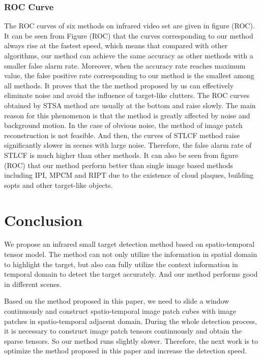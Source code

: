 \documentclass[journal]{IEEEtran}
\begin{document}
\subsubsection{ROC Curve}
The ROC curves of six methods on infrared video set are given in figure (ROC). It can be seen from Figure (ROC) that the curves corresponding to our method always rise at the fastest speed, which means that compared with other algorithms, our method can achieve the same accuracy as other methods with a smaller false alarm rate. Moreover, when the accuracy rate reaches maximum value, the false positive rate corresponding to our method is the smallest among all methods. It proves that the the method proposed by us can effectively eliminate noise and avoid the influence of target-like clutters. The ROC curves obtained by STSA method are usually at the bottom and raise slowly. The main reason for this phenomenon is that the method is greatly affected by noise and background motion. In the case of obvious noise, the method of image patch reconstruction is not feasible. And then, the curves of STLCF method raise significantly slower in scenes with large noise. Therefore, the false alarm rate of STLCF is much higher than other methods. It can also be seen from figure (ROC) that our method perform better than single image based methods including IPI, MPCM and RIPT due to the existence of cloud plaques, building sopts and other target-like objects.


\section{Conclusion}
We propose an infrared small target detection method based on spatio-temporal tensor model. The method can not only utilize the information in spatial domain to highlight the target, but also can fully utilize the context information in temporal domain to detect the target accurately. And our method performs good in different scenes.

Based on the method proposed in this paper, we need to slide a window continuously and construct spatio-temporal image patch cubes with image patches in spatio-temporal adjacent domain. During the whole detection process, it is necessary to construct image patch tensors continuously and obtain the sparse tensors. So our method runs slightly slower. Therefore, the next work is to optimize the method proposed in this paper and increase the detection speed.
\end{document}
